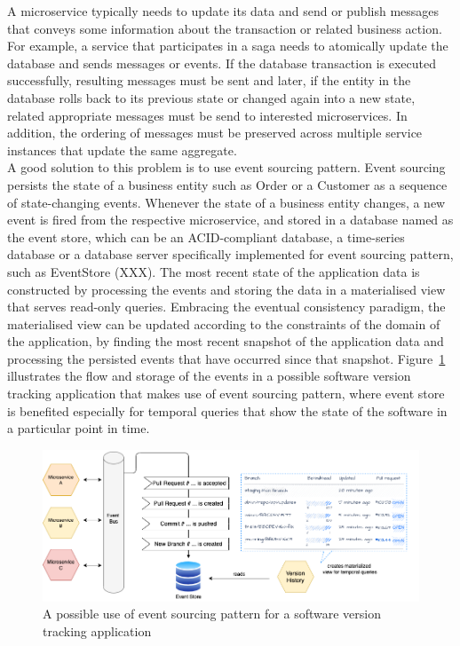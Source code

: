 \documentclass{Configuration_Files/PoliMi3i_thesis}
\begin{document}
A microservice typically needs to update its data and send or publish messages that conveys some information about the transaction or related business action.
For example, a service that participates in a saga needs to atomically update the database and sends messages or events.
If the database transaction is executed successfully, resulting messages must be sent and later, if the entity in the database rolls back to its previous state or changed again into a new state, related appropriate messages must be send to interested microservices.
In addition, the  ordering of messages must be preserved across multiple service instances that update the same aggregate.
\\
A good solution to this problem is to use event sourcing pattern.
Event sourcing persists the state of a business entity such as Order or a Customer as a sequence of state-changing events.
Whenever the state of a business entity changes, a new event is fired from the respective microservice, and stored in a database named as the event store, which can be an ACID-compliant database, a time-series database or a database server specifically implemented for event sourcing pattern, such as EventStore (XXX).
The most recent state of the application data is constructed by processing the events and storing the data in a materialised view that serves read-only queries.
Embracing the eventual consistency paradigm, the materialised view can be updated according to the constraints of the domain of the application, by finding the most recent snapshot of the application data and processing the persisted events that have occurred since that snapshot. Figure~\ref{fig:event_sourcing} illustrates the flow and storage of the events in a possible software version tracking application that makes use of event sourcing pattern, where event store is benefited especially for temporal queries that show the state of the software in a particular point in time.

\begin{figure}[H]
\centering
\includegraphics[width=1\textwidth]{myImages/event_store.png}
\caption{A possible use of event sourcing pattern for a software version tracking application}
\label{fig:event_sourcing}
\end{figure}
\end{document}
